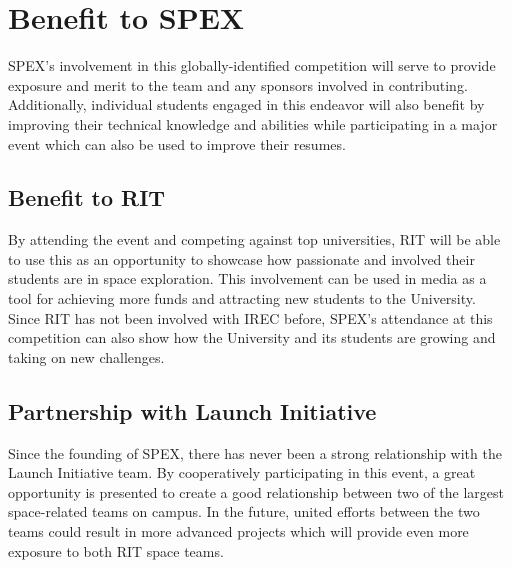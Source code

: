 \documentclass[conference]{IEEEtran} %
\begin{document}
\section{Benefit to SPEX}
\label{sec:Benefit to SPEX}

SPEX's involvement in this globally-identified competition will serve to provide exposure and merit to the team and any sponsors involved in contributing.
Additionally, individual students engaged in this endeavor will also benefit by improving their technical knowledge and abilities while
participating in a major event which can also be used to improve their resumes.


\subsection{Benefit to RIT}
\label{subsec:Benefit to RIT}
By attending the event and competing against top universities, RIT will be able to use this as an opportunity to showcase
how passionate and involved their students are in space exploration. This involvement can be used in media as a tool for
achieving more funds and attracting new students to the University. Since RIT has not been involved with IREC before, SPEX's attendance at
this competition can also show how the University and its students are growing and taking on new challenges.

\subsection{Partnership with Launch Initiative}
\label{subsec:Partnership with Launch Initiative}
Since the founding of SPEX, there has never been a strong relationship with the Launch Initiative team. By cooperatively participating
in this event, a great opportunity is presented to create a good relationship between two of the largest space-related teams on
campus. In the future, united efforts between the two teams could result in more advanced projects which will provide
even more exposure to both RIT space teams.
\end{document}
